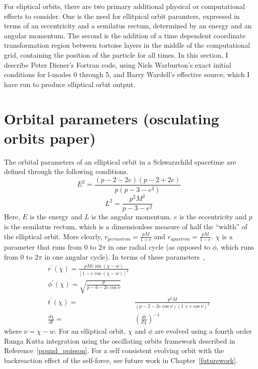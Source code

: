 For eliptical orbits, there are two primary additional physical or computational effects to consider. One is the need for ellitpical orbit paramters, expressed in terms of an eccentricity and a semilatus rectum, determined by an energy and an angular momentum. The second is the addition of a time dependent coordinate transformation region between tortoise layers in the middle of the computational grid, containing the position of the particle for all times. In this section, I describe Peter Diener's Fortran code, using Niels Warburton's exact initial conditions for l-modes 0 through 5, and Barry Wardell's effective source, which I have run to produce elliptical orbit output.

\section{Orbital parameters (osculating orbits paper)}

The orbital parameters of an elliptical orbit in a Schwarzchild spacetime are defined through the following conditions.
\begin{equation}
  E^2=\frac{(p-2-2e)(p-2+2e)}{p(p-3-e^2)}
\end{equation}
\begin{equation}
  L^2=\frac{p^2M^2}{p-3-e^2}
\end{equation}
Here, $E$ is the energy and $L$ is the angular momentum. $e$ is the eccentricity and $p$ is the semilatus rectum, which is a dimensionless measure of half the ``width'' of the elliptical orbit. More clearly, $r_{periastron}=\frac{pM}{1+e}$ and $r_{apastron}=\frac{pM}{1-e}$. $\chi$ is a parameter that runs from $0$ to $2\pi$ in one radial cycle (as opposed to $\phi$, which runs from $0$ to $2\pi$ in one angular cycle). In terms of these parameters~\cite{pound_poisson},
\begin{eqnarray}
  r^\prime(\chi)=\frac{pMe\sin(\chi-w)}{[1-e\cos(\chi-w)]^2}\\
  \phi^\prime(\chi)=\sqrt{\frac{p}{p-6-2e\cos\nu}}\\
  t^\prime(\chi)=&\frac{p^2M}{(p-2-2e\cos\nu)(1+e\cos\nu)^2}\nonumber\\
  \frac{d\chi}{dt}=&(\frac{dt}{d\chi})^{-1}
\end{eqnarray}
where $\nu=\chi-w$. For an elliptical orbit, $\chi$ and $\phi$ are evolved using a fourth order Runga Kutta integration using the oscillating orbits framework described in Reference~\ref{pound_poisson}. For a self consistent evolving orbit with the backreaction effect of the self-force, see future work in Chapter~\ref{futurework}.


